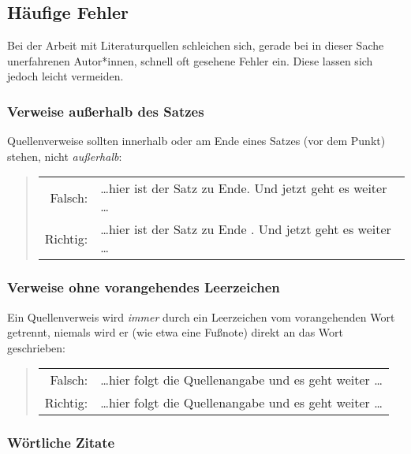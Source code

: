 \subsection{Häufige Fehler}

Bei der Arbeit mit Literaturquellen schleichen sich, gerade bei in dieser Sache
unerfahrenen Autor*innen, schnell oft gesehene Fehler ein. Diese lassen sich jedoch
leicht vermeiden.

\subsubsection{Verweise außerhalb des Satzes}

Quellenverweise sollten innerhalb oder am Ende eines Satzes (\dah vor dem
Punkt) stehen, nicht \emph{außerhalb}:
%
\begin{quote}
    \begin{tabular}{rl}
        \textrm{Falsch:}  & \ldots hier ist der Satz zu Ende.
        \cite{Oetiker2021} Und jetzt geht es weiter \ldots \\
        \textrm{Richtig:} & \ldots hier ist der Satz zu Ende
        \cite{Oetiker2021}. Und jetzt geht es weiter \ldots
    \end{tabular}
\end{quote}

\subsubsection{Verweise ohne vorangehendes Leerzeichen}

Ein Quellenverweis wird \emph{immer} durch ein Leerzeichen vom vorangehenden
Wort getrennt, niemals wird er (wie etwa eine Fußnote) direkt an das Wort
geschrieben:
%
\begin{quote}
    \begin{tabular}{rl}
        \textrm{Falsch:}  & \ldots hier folgt die
        Quellenangabe\cite{Oetiker2021} und es geht weiter \ldots  \\
        \textrm{Richtig:} & \ldots hier folgt die Quellenangabe
        \cite{Oetiker2021} und es geht weiter \ldots
    \end{tabular}
\end{quote}


\subsubsection{Wörtliche Zitate}

